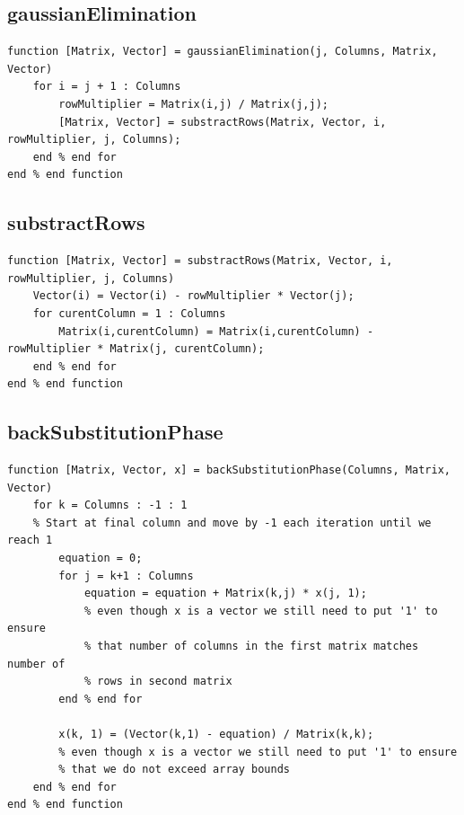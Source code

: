 \newpage
\subsection{gaussianElimination}
\begin{simplechar}
\begin{lstlisting}
function [Matrix, Vector] = gaussianElimination(j, Columns, Matrix, Vector)
    for i = j + 1 : Columns
        rowMultiplier = Matrix(i,j) / Matrix(j,j);
        [Matrix, Vector] = substractRows(Matrix, Vector, i, rowMultiplier, j, Columns);
    end % end for
end % end function
\end{lstlisting}
\end{simplechar}

\subsection{substractRows}
\begin{simplechar}
\begin{lstlisting}
function [Matrix, Vector] = substractRows(Matrix, Vector, i, rowMultiplier, j, Columns)
    Vector(i) = Vector(i) - rowMultiplier * Vector(j);
    for curentColumn = 1 : Columns
        Matrix(i,curentColumn) = Matrix(i,curentColumn) - rowMultiplier * Matrix(j, curentColumn);
    end % end for
end % end function
\end{lstlisting}
\end{simplechar}

\newpage
\subsection{backSubstitutionPhase}
\begin{simplechar}
\begin{lstlisting}
function [Matrix, Vector, x] = backSubstitutionPhase(Columns, Matrix, Vector)
    for k = Columns : -1 : 1
    % Start at final column and move by -1 each iteration until we reach 1
        equation = 0;
        for j = k+1 : Columns
            equation = equation + Matrix(k,j) * x(j, 1);
            % even though x is a vector we still need to put '1' to ensure
            % that number of columns in the first matrix matches number of
            % rows in second matrix
        end % end for

        x(k, 1) = (Vector(k,1) - equation) / Matrix(k,k);
        % even though x is a vector we still need to put '1' to ensure
        % that we do not exceed array bounds
    end % end for
end % end function
\end{lstlisting}
\end{simplechar}

